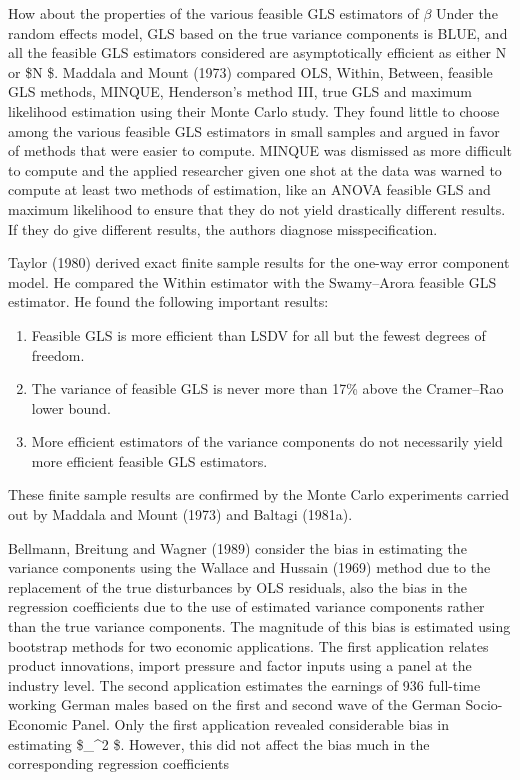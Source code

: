 \documentclass[
]{book}
\providecommand{\tightlist}{%
  \setlength{\itemsep}{0pt}\setlength{\parskip}{0pt}}
\begin{document}
How about the properties of the various feasible GLS estimators of \(\beta\) Under the random effects model, GLS based on the true variance components is BLUE, and all the feasible GLS estimators considered are asymptotically efficient as either N or \$N \rightarrow \infty \$. Maddala and Mount (1973) compared OLS, Within, Between, feasible GLS methods, MINQUE, Henderson's method III, true GLS and maximum likelihood estimation using their Monte Carlo study. They found little to choose among the various feasible GLS estimators in small samples and argued in favor of methods that were easier to compute. MINQUE was dismissed as more difficult to compute and the applied researcher given one shot at the data was warned to compute at least two methods of estimation, like an ANOVA feasible GLS and maximum likelihood to ensure that they do not yield drastically different results. If they do give different results, the authors diagnose misspecification.

Taylor (1980) derived exact finite sample results for the one-way error component model. He compared the Within estimator with the Swamy--Arora feasible GLS estimator. He found the following important results:

\begin{enumerate}
\def\labelenumi{(\arabic{enumi})}
\tightlist
\item
  Feasible GLS is more efficient than LSDV for all but the fewest degrees of freedom.
\item
  The variance of feasible GLS is never more than 17\% above the Cramer--Rao lower bound.
\item
  More efficient estimators of the variance components do not necessarily yield more efficient feasible GLS estimators.
\end{enumerate}

These finite sample results are confirmed by the Monte Carlo experiments carried out by Maddala and Mount (1973) and Baltagi (1981a).

Bellmann, Breitung and Wagner (1989) consider the bias in estimating the variance components using the Wallace and Hussain (1969) method due to the replacement of the true disturbances by OLS residuals, also the bias in the regression coefficients due to the use of estimated variance components rather than the true variance components. The magnitude of this bias is estimated using bootstrap methods for two economic applications. The first application relates product innovations, import pressure and factor inputs using a panel at the industry level. The second application estimates the earnings of 936 full-time working German males based on the first and second wave of the German Socio-Economic Panel. Only the first application revealed considerable bias in estimating \$\sigma\_\mu\^{}2 \$. However, this did not affect the bias much in the corresponding regression coefficients
\end{document}

